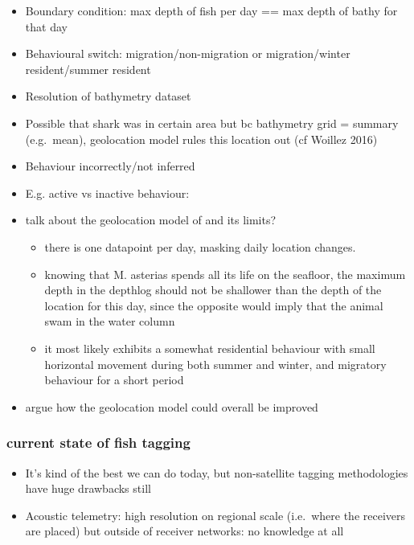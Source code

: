 \documentclass[
  authoryear,
  review,
  3p]{elsarticle}
\providecommand{\tightlist}{%
  \setlength{\itemsep}{0pt}\setlength{\parskip}{0pt}}\usepackage{longtable,booktabs,array}
\begin{document}
\begin{itemize}
\item
  Boundary condition: max depth of fish per day == max depth of bathy
  for that day
\item
  Behavioural switch: migration/non-migration or migration/winter
  resident/summer resident
\item
  Resolution of bathymetry dataset
\item
  Possible that shark was in certain area but bc bathymetry grid =
  summary (e.g.~mean), geolocation model rules this location out (cf
  Woillez 2016)
\item
  Behaviour incorrectly/not inferred
\item
  E.g. active vs inactive behaviour:
\item
  talk about the geolocation model of \citet{goossens_2023} and its
  limits?

  \begin{itemize}
  \tightlist
  \item
    there is one datapoint per day, masking daily location changes.
  \item
    knowing that M. asterias spends all its life on the seafloor, the
    maximum depth in the depthlog should not be shallower than the depth
    of the location for this day, since the opposite would imply that
    the animal swam in the water column
  \item
    it most likely exhibits a somewhat residential behaviour with small
    horizontal movement during both summer and winter, and migratory
    behaviour for a short period
  \end{itemize}
\item
  argue how the geolocation model could overall be improved
\end{itemize}

\hypertarget{current-state-of-fish-tagging}{%
\subsubsection{current state of fish
tagging}\label{current-state-of-fish-tagging}}

\begin{itemize}
\tightlist
\item
  It's kind of the best we can do today, but non-satellite tagging
  methodologies have huge drawbacks still
\item
  Acoustic telemetry: high resolution on regional scale (i.e.~where the
  receivers are placed) but outside of receiver networks: no knowledge
  at all
\end{itemize}
\end{document}
